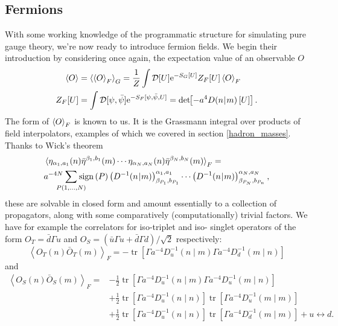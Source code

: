 \documentclass[a4paper,10pt]{article}
\begin{document}
\subsection{Fermions}
With some working knowledge of the programmatic structure for simulating pure gauge theory, we're now ready to introduce fermion fields. We begin their introduction by considering once again, the expectation value of an observable $O$
\begin{equation}\label{eq:compute_fermion_exp_val}
\begin{aligned}
\braket{O}&=\braket{\braket{O}_{F}}_G=\frac{1}{Z} \int \mathcal{D}[U] \mathrm{e}^{-S_{G}[U]} Z_{F}[U] \braket{O}_{F}\\
Z_{F}[U]&=\int \mathcal{D}[\psi, \bar{\psi}] \mathrm{e}^{-S_{F}[\psi, \bar{\psi}, U]}=\operatorname{det}\mkern-5mu\left[ -a^4D(n\mkern-4mu\mid \mkern-4mu m)\left[ U \right] \right].
\end{aligned}
\end{equation}
The form of $\braket{O}_{F}$ is known to us. It is the Grassmann integral over products of field interpolators, examples of which we covered in section \ref{hadron_masses}. Thanks to Wick's theorem
\begin{equation}
\begin{aligned}
&\braket{\eta_{\alpha_1,a_1}(n)\bar{\eta}^{\beta_1,b_1}(m)\cdots\eta_{\alpha_N,a_N}(n)\bar{\eta}^{\beta_N,b_N}(m)}_F = \\&a^{-4N} \mkern-18mu\sum\limits_{P(1,\ldots,N)}\mkern-18mu\operatorname{sign}\left( P \right)\left( D^{-1}(n\mkern-4mu\mid \mkern-4mu m) \right)_{\beta_{P_1},b_{P_1}}^{\alpha_1,a_1}\cdots\left( D^{-1}(n\mkern-4mu\mid \mkern-4mu m) \right)_{\beta_{P_N},b_{P_n}}^{\alpha_N,a_N},
\end{aligned}
\end{equation}
these are solvable in closed form and amount essentially to a collection of propagators, along with some comparatively (computationally) trivial factors. We have for example the correlators for iso-triplet and iso- singlet operators of the form $O_{T}=\bar{d} \Gamma u$ and $O_{S}=(\bar{u} \Gamma u+\bar{d} \Gamma d) / \sqrt{2}$ respectively:
\begin{equation}
\left\langle O_{T}(n) \bar{O}_{T}(m)\right\rangle_{F}=-\operatorname{tr}\left[\Gamma a^{-4}D_{u}^{-1}(n \mid m) \Gamma a^{-4}D_{d}^{-1}(m \mid n)\right]
\end{equation}
and
\begin{equation}
\begin{aligned}
\left\langle O_{S}(n) \bar{O}_{S}(m)\right\rangle_{F}=&-\frac{1}{2} \operatorname{tr}\left[\Gamma a^{-4}D_{u}^{-1}(n \mid m) \Gamma a^{-4}D_{u}^{-1}(m \mid n)\right] \\
&+\frac{1}{2} \operatorname{tr}\left[\Gamma a^{-4}D_{u}^{-1}(n \mid n)\right] \operatorname{tr}\left[\Gamma a^{-4}D_{u}^{-1}(m \mid m)\right] \\
&+\frac{1}{2} \operatorname{tr}\left[\Gamma a^{-4}D_{u}^{-1}(n \mid n)\right] \operatorname{tr}\left[\Gamma a^{-4}D_{d}^{-1}(m \mid m)\right]+u \leftrightarrow d.
\end{aligned}
\end{equation}
\end{document}
